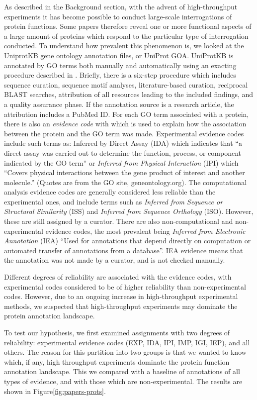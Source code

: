 \documentclass[10pt]{bmc_article}
\newenvironment{bmcformat}{\begin{raggedright}\baselineskip20pt\sloppy\setboolean{publ}{false}}{\end{raggedright}\baselineskip20pt\sloppy}
\begin{document}
\begin{bmcformat}
    As described in the Background section, with the advent of
high-throughput experiments it has become possible to conduct
large-scale interrogations of protein functions. Some papers therefore
reveal one or more functional aspects of a large amount of proteins
which respond to the particular type of interrogation conducted. To
understand how prevalent this phenomenon is, we looked at the UniprotKB
gene ontology annotation files, or UniProt GOA. UniProtKB is annotated
by GO terms both manually and automatically using an exacting procedure
described in \cite{UniprotKB-GOA}. Briefly, there is a six-step
procedure which includes sequence curation, sequence motif analyses,
literature-based curation, reciprocal BLAST\cite{BLAST} searches,
attribution of all resources leading to the included findings, and a
quality assurance phase. If the annotation source is a research article, the
attribution includes a PubMed ID.  For each GO term associated with a
protein, there is also an \textit{evidence code} with which is used to
explain how the association between the protein and the GO term was
made. Experimental evidence codes include such terms as: Inferred by
Direct Assay (IDA) which indicates that ``a direct assay was carried out
to determine the function, process, or component indicated by the GO
term'' or \textit{Inferred from Physical Interaction} (IPI) which ``Covers
physical interactions between the gene product of interest and another
molecule.'' (Quotes are from the GO site, geneontology.org). The
computational analysis evidence codes are generally considered less
reliable than the experimental ones, and include terms such as
\textit{Inferred from Sequence or Structural Similarity} (ISS) and
\textit{Inferred from Sequence Orthology} (ISO). However, these are still
assigned by a curator. There are also
non-computational and non-experimental evidence codes, the most
prevalent being \textit{Inferred from Electronic Annotation} (IEA) ``Used
for annotations that depend directly on computation or automated
transfer of annotations from a database''. IEA evidence means that the
annotation was not made by a curator, and is not checked manually. 

Different degrees of reliability are associated with the  evidence codes, with
experimental codes considered to be of higher reliability than non-experimental
codes. However, due to an ongoing increase in high-throughput experimental
methods, we suspected that high-throughput experiments may dominate the protein
annotation landscape. 

To test our hypothesis, we first examined assignments with two degrees of reliability:
experimental evidence codes (EXP, IDA, IPI, IMP, IGI, IEP), and all others. The
reason for this partition into two groups is that we wanted to know which, if
any, high throughput experiments dominate the protein function annotation
landscape. This we compared with a baseline of annotations of all types of
evidence, and with those which are non-experimental. The results are shown in
Figure\ref{fig:papers-prots}.


\end{bmcformat}
\end{document}

